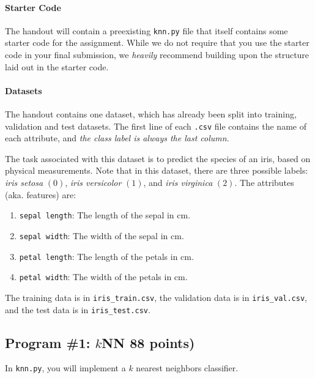 \documentclass[11pt,addpoints,answers]{exam}
\begin{document}
\paragraph{Starter Code} The handout will contain a preexisting \texttt{knn.py} file that itself contains some starter code for the assignment. While we do not require that you use the starter code in your final submission, we \emph{heavily} recommend building upon the structure laid out in the starter code.

\paragraph{Datasets}

The handout contains one dataset, which has already been split into training, validation and test datasets. The first line of each \lstinline{.csv} file contains the name of each attribute, and \emph{the class label is always the last column}.

The task associated with this dataset is to predict the species of an iris, based on physical measurements. Note that in this dataset, there are three possible labels: \emph{iris setosa} $(0)$, \emph{iris versicolor} $(1)$, and \emph{iris virginica} $(2)$. The attributes (aka. features) are: 
\begin{enumerate}
    \item \lstinline{sepal length}: The length of the sepal in cm.
    \item \lstinline{sepal width}: The width of the sepal in cm.
    \item \lstinline{petal length}: The length of the petals in cm.
    \item \lstinline{petal width}: The width of the petals in cm.
\end{enumerate}
The training data is in \lstinline{iris_train.csv}, the validation data is in \lstinline{iris_val.csv}, and the test data is in \lstinline{iris_test.csv}.

\subsection{Program \#1: $k$NN 88 points)}

In \texttt{knn.py}, you will implement a $k$ nearest neighbors classifier. 
\end{document}
